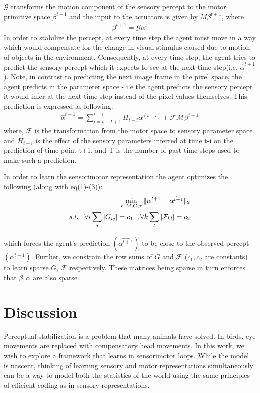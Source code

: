 \documentclass[conference]{IEEEtran}
\begin{document}
$\mathcal{G}$ transforms the motion component of the sensory percept to the motor primitive space $\beta^{t+1}$ and the input to the actuators is given by $M\beta^{t+1}$, where
\begin{eqnarray}
\beta^{t+1} = \mathcal{G} \alpha^{t}
\end{eqnarray}
In order to stabilize the percept, at every time step the agent must move in a way which would compensate for the change in visual stimulus caused due to motion of objects in the environment. Consequently, at every time step, the agent tries to predict the sensory percept which it expects to see at the next time step(i.e. $\hat{\alpha}^{t+1}$). Note, in contrast to predicting the next image frame in the pixel space, the agent predicts in the parameter space - i.e the agent predicts the sensory percept it would infer at the next time step instead of the pixel values themselves. This prediction is expressed as following:
\begin{eqnarray}
\hat{\alpha}^{t+1} = \sum_{i=t-T+1}^{t-1}  H_{t-i} \alpha^{(t-i)} + \mathcal{F}\mathcal{M}\beta^{t+1} 
\end{eqnarray}
where, $\mathcal{F}$ is the transformation from the motor space to sensory parameter space and $H_{t-i}$ is the effect of the sensory parameters inferred at time t-i on the prediction of time point t+1, and T is the number of past time steps used to make such a prediction. 

In order to learn the sensorimotor representation the agent optimizes the following (along with eq(1)-(3)):
\begin{eqnarray}
\min_{F,M,G,\tau} \| \alpha^{t+1} - \hat{\alpha^{t+1}} \|_{2} \\
\nonumber \textit{s.t.} \hspace{3mm} \forall i \sum_{j}  |G_{ij}| = c_1  \hspace{2mm}, \forall k \sum_{l}  |\mathcal{F}_{kl}| = c_2 
\end{eqnarray}

which forces the agent's prediction $(\hat{\alpha^{t+1}})$ to be close to the observed percept$({\alpha^{t+1}})$. Further, we constrain the row sums of $G$ and $\mathcal{F}$ $(c_1, c_2 $ are constants) to learn sparse $G$, $\mathcal{F}$ respectively. These matrices being sparse in turn enforces that $\beta,\hat{\alpha} $ are also sparse.

\section{Discussion}
Perceptual stabilization is a problem that many animals have solved. In birds, eye movements are replaced with compensatory head movements. In this work, we wish to explore a framework that learns in sensorimotor loops. While the model is nascent, thinking of learning sensory and motor representations simultaneously can be a way to model both the statistics of the world using the same principles of efficient coding as in sensory representations.
\end{document}
